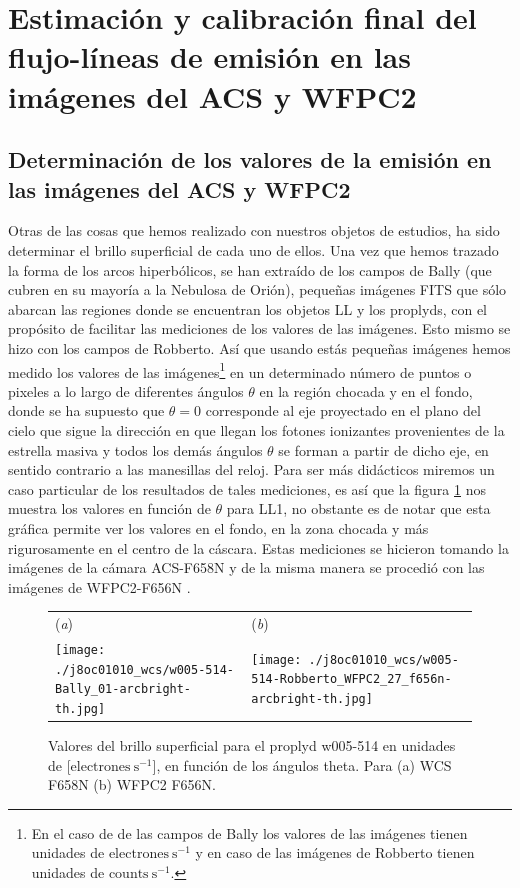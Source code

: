 \section{Estimación y calibración final del flujo-líneas de emisión en las imágenes del ACS y WFPC2}
\label{sec:clibration-final}

\subsection{Determinación de los valores  de la emisión en las imágenes del ACS y WFPC2 }
\label{sec:brillo-superficial}
Otras de las cosas que hemos realizado con nuestros objetos de estudios, ha  sido determinar el brillo superficial de cada uno de ellos. Una vez que hemos trazado la forma de los arcos hiperbólicos, se han extraído de los campos de Bally (que cubren en su mayoría a la Nebulosa de Orión), pequeñas imágenes FITS que sólo abarcan las regiones donde se encuentran los objetos LL y los proplyds, con el propósito de facilitar las mediciones de los valores de las imágenes. Esto mismo se hizo con los campos de Robberto. Así que usando estás pequeñas imágenes hemos medido los valores de las imágenes\footnote{En el caso de de las campos de Bally los valores de las imágenes tienen unidades de \(\mathrm{electrones~s^{-1}}\) y en caso de las imágenes de Robberto tienen unidades de \(\text{counts}~\text{s}^{-1}\).} en un determinado número de puntos o pixeles a lo largo de diferentes ángulos \(\theta\) en la región chocada y en el fondo, donde se ha supuesto que \(\theta = 0\) corresponde al eje proyectado en el plano del cielo que sigue la dirección en que llegan los fotones ionizantes provenientes de la estrella masiva y todos los demás ángulos \(\theta\) se forman a partir de dicho eje, en sentido contrario a las manesillas del reloj. Para ser más didácticos miremos un caso particular de los resultados de tales mediciones, es así que la figura \ref{fig:brillo-theta} nos muestra los valores en función de \(\theta\) para LL1, no obstante es de notar que esta gráfica permite ver los valores en el fondo, en la zona chocada y más rigurosamente en el centro de la cáscara. Estas mediciones se hicieron tomando la imágenes de la cámara ACS-F658N y de la misma manera se procedió con las imágenes de WFPC2-F656N \citep{Robberto:2013a}. \\

\begin{figure}[htp]
\centering
\begin{tabular}{l l}
(\textit{a}) & (\textit{b})  \\
  \texttt{[image: ./j8oc01010\_wcs/w005-514-Bally\_01-arcbright-th.jpg]}
& \texttt{[image: ./j8oc01010\_wcs/w005-514-Robberto\_WFPC2\_27\_f656n-arcbright-th.jpg]}\\
\end{tabular}
\caption{Valores del brillo superficial para el proplyd w005-514 en unidades de [\(\text{electrones}~\text{s}^{-1}\)], en función de los ángulos theta. Para (a) WCS F658N (b) WFPC2 F656N.}\label{fig:brillo-theta}
\end{figure}


